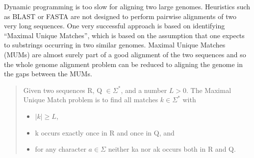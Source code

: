 \documentclass[runningheads,a4paper]{llncs}
\begin{document}
Dynamic programming is too slow for aligning two large genomes. Heuristics such as BLAST \cite{Blast} or FASTA \cite{Fasta} are not designed to perform pairwise alignments of two very long sequences. One very successful approach is based on identifying ``Maximal Unique Matches'', which is based on the assumption that one expects to substrings occurring in two similar genomes. Maximal Unique Matches (MUMs) are almost surely part of a good alignment of the two sequences and so the whole genome alignment problem can be reduced to aligning the genome in the gaps between the MUMs.\\
\begin{quote}
  Given two sequences R, Q $\in \Sigma^*$, and a number $L > 0$. The Maximal Unique Match problem is to find all matches $k \in \Sigma^*$ with
  \begin{itemize}
    \item $|k|\geq L$,
    \item k occurs exactly once in R and once in Q, and
    \item for any character $a \in \Sigma$ neither ka nor ak occurs both in R and Q.
  \end{itemize}
\end{quote}
\end{document}
